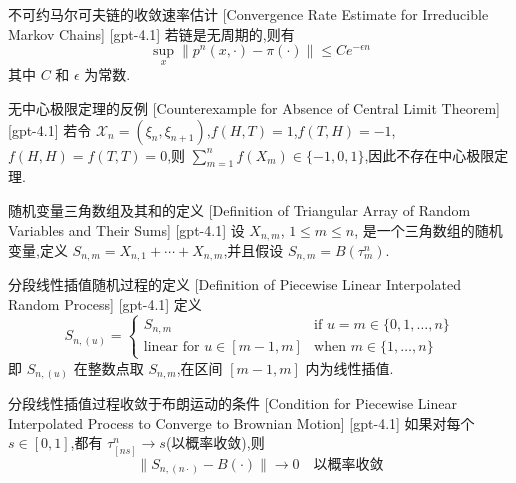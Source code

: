 \documentclass[UTF8]{ctexart}
\begin{document}
    \begin{thm}
        {不可约马尔可夫链的收敛速率估计}
        [Convergence Rate Estimate for Irreducible Markov Chains]
        [gpt-4.1]
        若链是无周期的,则有
\[
\sup_{x} \| p^{n}(x, \cdot) - \pi(\cdot) \| \leq C e^{-\epsilon n}
\]
其中 $C$ 和 $\epsilon$ 为常数.
    \end{thm}
    
    
    
    \begin{cxmp}
        {无中心极限定理的反例}
        [Counterexample for Absence of Central Limit Theorem]
        [gpt-4.1]
        若令 $\mathcal{X}_{n} = (\xi_{n}, \xi_{n+1})$,$f(H, T) = 1$,$f(T, H) = -1$,$f(H, H) = f(T, T) = 0$,则 $\sum_{m=1}^{n} f(X_{m}) \in \{-1, 0, 1\}$,因此不存在中心极限定理.
    \end{cxmp}
    
    
    
    \begin{dfn}
        {随机变量三角数组及其和的定义}
        [Definition of Triangular Array of Random Variables and Their Sums]
        [gpt-4.1]
        设 $X_{n,m}$, $1 \leq m \leq n$, 是一个三角数组的随机变量,定义 $S_{n,m} = X_{n,1} + \cdots + X_{n,m}$,并且假设 $S_{n,m} = B(\tau_{m}^{n})$.
    \end{dfn}
    
    
    
    \begin{dfn}
        {分段线性插值随机过程的定义}
        [Definition of Piecewise Linear Interpolated Random Process]
        [gpt-4.1]
        定义
\[
S_{n,(u)} = \left\{
    \begin{array}{cl}
        S_{n,m} & \text{if } u = m \in \{0, 1, \ldots, n\} \\
        \text{linear for } u \in [m-1, m] & \text{when } m \in \{1, \ldots, n\}
    \end{array}
\right.
\]
即 $S_{n,(u)}$ 在整数点取 $S_{n,m}$,在区间 $[m-1, m]$ 内为线性插值.
    \end{dfn}
    
    
    
    \begin{lma}
        {分段线性插值过程收敛于布朗运动的条件}
        [Condition for Piecewise Linear Interpolated Process to Converge to Brownian Motion]
        [gpt-4.1]
        如果对每个 $s \in [0, 1]$,都有 $\tau_{[ns]}^{n} \to s$(以概率收敛),则
\[
\| S_{n, (n \cdot)} - B(\cdot) \| \to 0 \quad \text{以概率收敛}
\]

    \end{lma}
    
\end{document}
